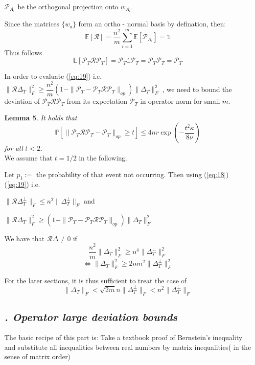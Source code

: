 \documentclass{article}
\begin{document}
 $\mathcal{P}_{A_i}$ be the orthogonal projection onto $w_{A_i}$. 

Since the matrices $\lbrace w_a\rbrace$ form an ortho - normal basis by defination, then:
\[
\mathbb{E}[\mathcal{R}] = \dfrac{n^2}{m}\sum_{i=1}^m \mathbb{E}[{\mathcal{P}_{A_i}}] = \mathbb{1}
\]
Thus follows 
\[
\mathbb{E}[\mathcal{P}_T\mathcal{R}\mathcal{P}_T] = \mathcal{P}_T\mathbb{1}\mathcal{P}_T = \mathcal{P}_T\mathcal{P}_T = \mathcal{P}_T
\]

In order to evaluate (\ref{eq:19}) i.e. $\|\mathcal{R}\Delta_T\|_F^2 \ge \dfrac{n^2}{m}(1- \|\mathcal{P}_T-\mathcal{P}_T\mathcal{R}\mathcal{P}_T\|_{op})\|\Delta_T\|_F^2$ , we need to bound the deviation of           $\mathcal{P}_T\mathcal{R}\mathcal{P}_T$ from its expectation $\mathcal{P}_T$ in operator norm for small $m$.

\textbf{Lemma 5}. \textit{It holds that}
\begin{equation}
\mathbb{P}[\|\mathcal{P}_T\mathcal{R}\mathcal{P}_T-\mathcal{P}_T\|_{op}\ge t]\le 4nr \exp\left(-\dfrac{t^2\kappa}{8\nu}\right)
\end{equation}
\textit{for all} $t<2$.
\\[2ex]
We assume that $t = 1/2$ in the following. 

Let $p_1 := $ the probability of that event not occurring. Then using (\ref{eq:18})(\ref{eq:19}) i.e.

$\|\mathcal{R}\Delta_T^\perp\|_F \le n^2 \|\Delta_T^\perp\|_F$ and

 $\|\mathcal{R}\Delta_T\|_F^2 \ge (1- \|\mathcal{P}_T-\mathcal{P}_T\mathcal{R}\mathcal{P}_T\|_{op})\|\Delta_T\|_F^2$ 

We have that $\mathcal{R}\Delta \neq 0$ if
\[
\dfrac{n^2}{m}\|\Delta_T\|_F^2 \ge n^4\|\Delta_T^\perp\|_F^2 \]
\[\Leftrightarrow \|\Delta_T\|_F^2  \ge 2mn^2\|\Delta_T^\perp\|_F^2
\]

For the later sections, it is thus sufficient to treat the case of 
\begin{equation}
\|\Delta_T\|_F  < \sqrt{2m}n\|\Delta_T^\perp\|_F < n^2\|\Delta_T^\perp\|_F
\end{equation}

\subsection{\textit{\uppercase\expandafter{}. Operator large deviation bounds}}


The basic recipe of this part is: Take a textbook proof of Bernstein's inequality and substitute all inequalities between real numbers by matrix inequalities( in the sense of matrix order)
\end{document}
